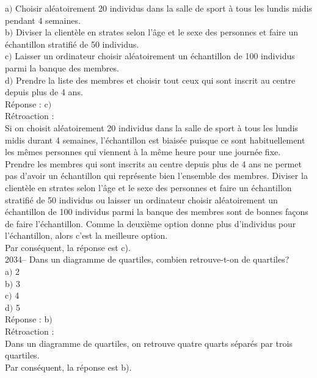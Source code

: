 \documentclass[letterpaper, 12pt]{article}
\begin{document}
a$)$ Choisir al\'eatoirement 20 individus dans la salle de sport \`a tous les lundis midis pendant 4 semaines.\\
b$)$ Diviser la client\`ele en strates selon l'\^age et le sexe des personnes et faire un \'echantillon stratifi\'e de 50 individus.\\
c$)$ Laisser un ordinateur choisir al\'eatoirement un \'echantillon de 100 individus parmi la banque des membres.\\
d$)$ Prendre la liste des membres et choisir tout ceux qui sont inscrit au centre depuis plus de 4 ans. \\

R\'eponse : c$)$\\

R\'etroaction :\\
Si on choisit al\'eatoirement 20 individus dans la salle de sport \`a tous les lundis midis durant 4 semaines, l'\'echantillon est biais\'ee puisque ce sont habituellement les m\^emes personnes qui viennent \`a la m\^eme heure pour une journ\'ee fixe. Prendre les membres qui sont inscrits au centre depuis plus de 4 ans ne permet pas d'avoir un \'echantillon qui repr\'esente bien l'ensemble des membres. Diviser la client\`ele en strates selon l'\^age et le sexe des personnes et faire un \'echantillon stratifi\'e de 50 individus ou laisser un ordinateur choisir al\'eatoirement un \'echantillon de 100 individus parmi la banque des membres sont de bonnes fa\c cons de faire l'\'echantillon. Comme la deuxi\`eme option donne plus d'individus pour l'\'echantillon, alors c'est la meilleure option.\\
Par cons\'equent, la r\'eponse est c).\\


2034-- Dans un diagramme de quartiles, combien retrouve-t-on de quartiles?\\

a$)$ 2\\
b$)$ 3\\
c$)$ 4\\
d$)$ 5\\

R\'eponse : b$)$\\

R\'etroaction :\\
Dans un diagramme de quartiles, on retrouve quatre quarts s\'epar\'es par trois quartiles. \\
Par cons\'equent, la r\'eponse est b).\\\\
\end{document}
